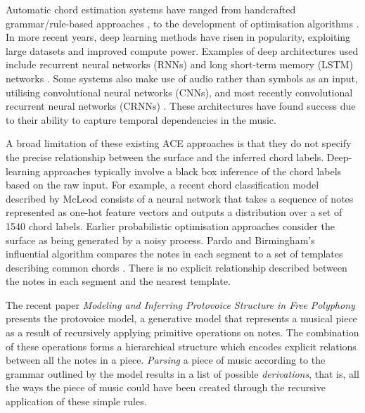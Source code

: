 \documentclass[12pt,a4paper,twoside,openany]{report} \usepackage[pdfborder={0 0 0}]{hyperref}    %
\theoremstyle{definition} \newtheorem{definition}{Definition}[section]
\begin{document}
    Automatic chord estimation systems have ranged from handcrafted grammar/rule-based approaches
    \cite{maxwellExpertSystemHarmonizing1992} \cite{winogradLinguisticsComputerAnalysis1968}, to the
    development of optimisation algorithms \cite{pardoAlgorithmsChordalAnalysis2002}. 
    In more recent years, deep learning methods have risen in popularity, exploiting large datasets and improved compute
    power. Examples of deep architectures used include recurrent neural networks (RNNs)
    \cite{chenFunctionalHarmonyRecognition2018a} and long short-term memory (LSTM)
    networks \cite{dengLargeVocabularyAutomatic2018}. Some systems also make use of audio rather than symbols as an
    input, utilising
    convolutional neural networks (CNNs), and most recently convolutional recurrent neural networks (CRNNs)
    \cite{wuAutomaticChordEstimation2019} \cite{fardAutomaticChordRecognition2020}. These architectures have
    found success due to their ability to capture temporal dependencies in the music.

    A broad limitation of these existing ACE approaches is that they do not specify the precise relationship
    between the surface and the inferred chord labels. Deep-learning approaches
    typically involve a black box inference of the chord labels based on the raw input. For example, a recent chord classification model described by McLeod
    \cite{mcleodModularSystemHarmonic2021} consists of a neural network that takes a sequence of notes represented as
    one-hot feature vectors and outputs a distribution over a set of 1540 chord labels.
    Earlier probabilistic optimisation approaches consider the surface as being generated by a noisy process. Pardo and
    Birmingham's influential algorithm compares the notes in each segment to a set
    of templates describing common chords \cite{pardoAlgorithmsChordalAnalysis2002}. There is no explicit
    relationship described between the notes in each segment and the nearest template.

    The recent paper \textit{Modeling and Inferring Protovoice Structure in Free
    Polyphony}\cite{finkensiepModelingInferringProtovoice2021} presents the protovoice model, a generative model that
    represents a musical piece as a result of recursively applying primitive operations on notes. 
    The combination of these operations forms a hierarchical structure which encodes explicit relations
    between all the notes in a piece. 
    \textit{Parsing} a piece of music according to the grammar outlined by the model results in a list of possible
    \textit{derivations}, that is, all the ways the piece of music could have been created through the recursive application of these simple rules. 
\end{document}
